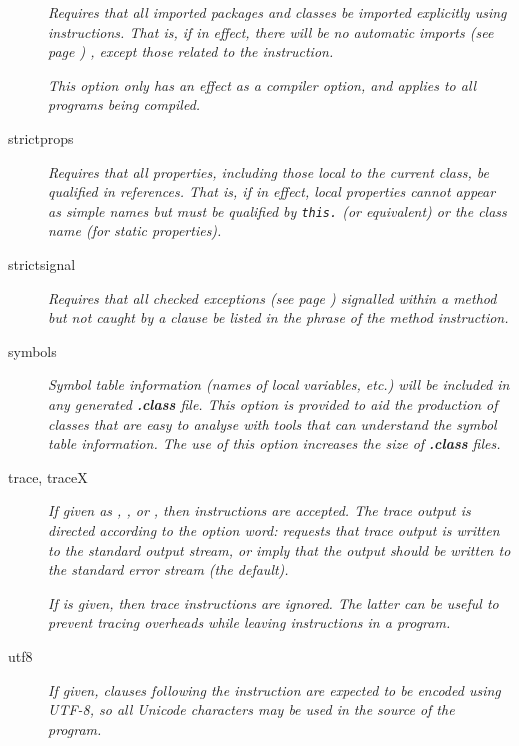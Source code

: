 \begin{description}
\emph{Requires that all imported packages and classes be imported
explicitly using  instructions.  That is, if in effect,
there will be no  automatic imports (see page \pageref{refimport}) , except those
related to the  instruction.}
 
\emph{This option only has an effect as a compiler option, and applies to all
programs being compiled.}
\item[strictprops]

\emph{Requires that all properties, including those local to the
current class, be qualified in references.
That is, if in effect, local properties cannot appear as simple names
but must be qualified by \texttt{this.} (or equivalent) or the class name
(for static properties).}
\item[strictsignal]
\emph{Requires that all  checked exceptions (see page \pageref{refchecked}) 
signalled within a method but not caught by a  clause be
listed in the  phrase of the method instruction.}
\item[symbols]

\emph{Symbol table information (names of local variables, \emph{etc.})
will be included in any generated \textbf{.class} file.
This option is provided to aid the production of classes that are easy
to analyse with tools that can understand the symbol table information.
The use of this option increases the size of \textbf{.class}
files.}
\item[trace, traceX]

\emph{If given as , , or ,
then  instructions are accepted.  The trace output is
directed according to the option word:  requests
that trace output is written to the standard output stream,
 or  imply that the output should be
written to the standard error stream (the default).}
 
\emph{If  is given, then trace instructions are ignored.
The latter can be useful to prevent tracing overheads while leaving
 instructions in a program.}
\item[utf8]
\emph{If given, clauses following the  instruction are
expected to be encoded using UTF-8, so all Unicode characters may be
used in the source of the program.}
 

\end{description}
